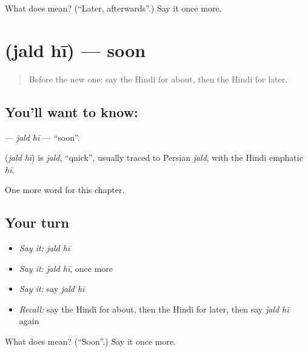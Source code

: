 \begin{tcolorbox}[breakable,colback=teal!4,colframe=teal!35!black,title={Before you move on}]
What does   mean? (\textquotedblleft{}Later, afterwards\textquotedblright{}.) Say it once more.
\end{tcolorbox}
\section[\texorpdfstring{\hi{जल्द} \hi{ही} (jald hī)}{जल्द ही (jald hī)}]{  (jald hī) — soon}

\label{lesson:HI-C248-jaldhi}



\begin{quote}
Before the new one: say the Hindi for about, then the Hindi for later.
\end{quote}

\subsection*{You'll want to know:  }
\textbf{ } — \emph{jald hī} — \textquotedblleft{}soon\textquotedblright{}.

\begin{cousinweb}
\textbf{ } (\emph{jald hī}) is \emph{jald}, \textquotedblleft{}quick\textquotedblright{}, usually traced to Persian \emph{jald}, with the Hindi emphatic \emph{hī}.
\end{cousinweb}

\begin{grammarlens}[title={What you've built}]
One more word for this chapter.
\end{grammarlens}

\subsection*{Your turn}
\begin{itemize}
\raggedright
  \item \emph{Say it:} \emph{jald hī}
  \item \emph{Say it:} \emph{jald hī}, once more
  \item \emph{Say it:} say \emph{jald hī}
  \item \emph{Recall:} say the Hindi for about, then the Hindi for later, then say \emph{jald hī} again
\end{itemize}

\begin{tcolorbox}[breakable,colback=teal!4,colframe=teal!35!black,title={Before you move on}]
What does   mean? (\textquotedblleft{}Soon\textquotedblright{}.) Say it once more.
\end{tcolorbox}

